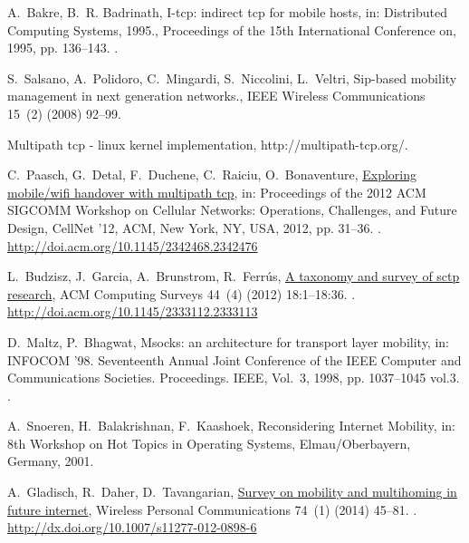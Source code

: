 \documentclass[preprint,12pt]{elsarticle}
\begin{document}
\begin{thebibliography}{10}
A.~Bakre, B.~R. Badrinath, I-tcp: indirect tcp for mobile hosts, in:
  Distributed Computing Systems, 1995., Proceedings of the 15th International
  Conference on, 1995, pp. 136--143.
\newblock \href {http://dx.doi.org/10.1109/ICDCS.1995.500012}
  {}.

S.~Salsano, A.~Polidoro, C.~Mingardi, S.~Niccolini, L.~Veltri, Sip-based
  mobility management in next generation networks., IEEE Wireless
  Communications 15~(2) (2008) 92--99.

Multipath tcp - linux kernel implementation, http://multipath-tcp.org/.

C.~Paasch, G.~Detal, F.~Duchene, C.~Raiciu, O.~Bonaventure,
  \href{http://doi.acm.org/10.1145/2342468.2342476}{Exploring mobile/wifi
  handover with multipath tcp}, in: Proceedings of the 2012 ACM SIGCOMM
  Workshop on Cellular Networks: Operations, Challenges, and Future Design,
  CellNet '12, ACM, New York, NY, USA, 2012, pp. 31--36.
\newblock \href {http://dx.doi.org/10.1145/2342468.2342476}
  {}.
\newline\urlprefix\url{http://doi.acm.org/10.1145/2342468.2342476}

L.~Budzisz, J.~Garcia, A.~Brunstrom, R.~Ferr\'{u}s,
  \href{http://doi.acm.org/10.1145/2333112.2333113}{A taxonomy and survey of
  sctp research}, ACM Computing Surveys 44~(4) (2012) 18:1--18:36.
\newblock \href {http://dx.doi.org/10.1145/2333112.2333113}
  {}.
\newline\urlprefix\url{http://doi.acm.org/10.1145/2333112.2333113}

D.~Maltz, P.~Bhagwat, Msocks: an architecture for transport layer mobility, in:
  INFOCOM '98. Seventeenth Annual Joint Conference of the IEEE Computer and
  Communications Societies. Proceedings. IEEE, Vol.~3, 1998, pp. 1037--1045
  vol.3.
\newblock \href {http://dx.doi.org/10.1109/INFCOM.1998.662913}
  {}.

A.~Snoeren, H.~Balakrishnan, F.~Kaashoek, {Reconsidering Internet Mobility},
  in: 8th Workshop on Hot Topics in Operating Systems, Elmau/Oberbayern,
  Germany, 2001.

A.~Gladisch, R.~Daher, D.~Tavangarian,
  \href{http://dx.doi.org/10.1007/s11277-012-0898-6}{Survey on mobility and
  multihoming in future internet}, Wireless Personal Communications 74~(1)
  (2014) 45--81.
\newblock \href {http://dx.doi.org/10.1007/s11277-012-0898-6}
  {}.
\newline\urlprefix\url{http://dx.doi.org/10.1007/s11277-012-0898-6}


\end{thebibliography}
\end{document}
